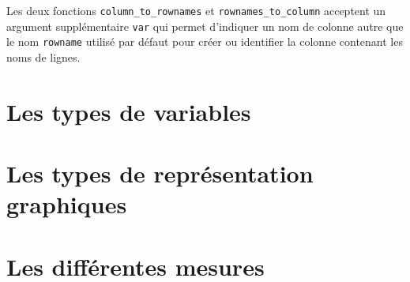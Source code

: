 \documentclass[]{book}
\begin{document}
\begin{rmdnote}
Les deux fonctions \texttt{column\_to\_rownames} et
\texttt{rownames\_to\_column} acceptent un argument supplémentaire
\texttt{var} qui permet d'indiquer un nom de colonne autre que le nom
\texttt{rowname} utilisé par défaut pour créer ou identifier la colonne
contenant les noms de lignes.
\end{rmdnote}

\chapter{Les types de variables}\label{typesvariables}

\chapter{Les types de représentation graphiques}\label{graphiques}

\chapter{Les différentes mesures}\label{mesures}


\end{document}
